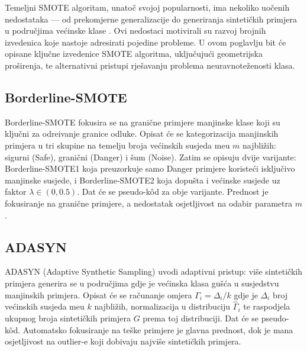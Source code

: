 
Temeljni SMOTE algoritam, unato\v{c} svojoj popularnosti, ima nekoliko
uo\v{c}enih nedostataka --- od prekomjerne generalizacije do generiranja
sinteti\v{c}kih primjera u podru\v{c}jima ve\'{c}inske klase
\cite{fernandez2018}. Ovi nedostaci motivirali su razvoj brojnih
izvedenica koje nastoje adresirati pojedine probleme. U ovom poglavlju
bit \'{c}e opisane klju\v{c}ne izvedenice SMOTE algoritma, uklju\v{c}uju\'{c}i
geometrijska pro\v{s}irenja, te alternativni pristupi rje\v{s}avanju
problema neuravnote\v{z}enosti klasa.

\subsection{Borderline-SMOTE}

Borderline-SMOTE \cite{han2005} fokusira se na grani\v{c}ne primjere
manjinske klase koji su klju\v{c}ni za odre\dj{}ivanje granice odluke.
Opisat \'{c}e se kategorizacija manjinskih primjera u tri skupine na
temelju broja ve\'{c}inskih susjeda me\dj{}u $m$ najbli\v{z}ih: sigurni
(Safe), grani\v{c}ni (Danger) i \v{s}um (Noise). Zatim se opisuju
dvije varijante: Borderline-SMOTE1 koja preuzorkuje samo Danger primjere
koriste\'{c}i isklju\v{c}ivo manjinske susjede, i Borderline-SMOTE2 koja
dopu\v{s}ta i ve\'{c}inske susjede uz faktor $\lambda \in (0, 0.5)$.
Dat \'{c}e se pseudo-k\^{o}d za obje varijante. Prednost je fokusiranje
na grani\v{c}ne primjere, a nedostatak osjetljivost na odabir parametra
$m$.

\subsection{ADASYN}

ADASYN (Adaptive Synthetic Sampling) \cite{he2008adasyn} uvodi adaptivni
pristup: vi\v{s}e sinteti\v{c}kih primjera generira se u podru\v{c}jima
gdje je ve\'{c}inska klasa gu\v{s}\'{c}a u susjedstvu manjinskih primjera.
Opisat \'{c}e se ra\v{c}unanje omjera $\Gamma_i = \Delta_i / k$ gdje je
$\Delta_i$ broj ve\'{c}inskih susjeda me\dj{}u $k$ najbli\v{z}ih,
normalizacija u distribuciju $\hat{\Gamma}_i$ te raspodjela ukupnog broja
sinteti\v{c}kih primjera $G$ prema toj distribuciji. Dat \'{c}e se
pseudo-k\^{o}d. Automatsko fokusiranje na te\v{s}ke primjere je glavna
prednost, dok je mana osjetljivost na outlier-e koji dobivaju najvi\v{s}e
sinteti\v{c}kih primjera.

